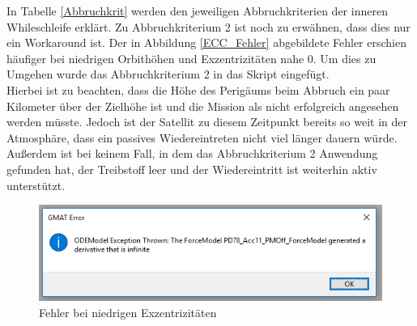 In Tabelle \eqref{Abbruchkrit} werden den jeweiligen Abbruchkriterien der inneren Whileschleife erklärt. Zu Abbruchkriterium 2 ist noch zu erwähnen, dass dies nur ein Workaround ist. 
Der in Abbildung \eqref{ECC_Fehler} abgebildete Fehler erschien häufiger bei niedrigen Orbithöhen und Exzentrizitäten nahe 0. Um dies zu Umgehen wurde das Abbruchkriterium 2 in das Skript eingefügt.\\
Hierbei ist zu beachten, dass die Höhe des Perigäums beim Abbruch ein paar Kilometer über der Zielhöhe ist und die Mission als nicht erfolgreich angesehen werden müsste. Jedoch ist der Satellit zu diesem Zeitpunkt bereits so weit in der Atmosphäre, dass ein passives Wiedereintreten nicht viel länger dauern würde. Außerdem ist bei keinem Fall, in dem das Abbruchkriterium 2 Anwendung gefunden hat, der Treibstoff leer und der Wiedereintritt ist weiterhin aktiv unterstützt.

\begin{figure}[h!]
\includegraphics{./graphics/GMAT/ECC_Fehler.png}
\caption{Fehler bei niedrigen Exzentrizitäten}
\label{ECC_Fehler}
\end{figure} 





